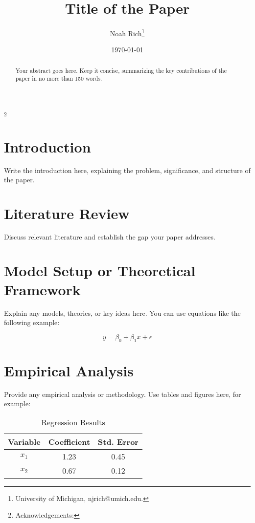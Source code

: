 \documentclass[12pt,letterpaper]{article}
\title{Title of the Paper}
\author{Noah Rich\footnote{University of Michigan, njrich@umich.edu.}}
\date{\today}
\begin{document}
\maketitle
\footnote{Acknowledgements:}

\begin{abstract}
    Your abstract goes here. Keep it concise, summarizing the key contributions of the paper in no more than 150 words.
\end{abstract}

\newpage

\section{Introduction}

Write the introduction here, explaining the problem, significance, and structure of the paper.

\section{Literature Review}
Discuss relevant literature and establish the gap your paper addresses.

\section{Model Setup or Theoretical Framework}
Explain any models, theories, or key ideas here. You can use equations like the following example:

\begin{equation}
    y = \beta_0 + \beta_1 x + \epsilon
\end{equation}

\section{Empirical Analysis}
Provide any empirical analysis or methodology. Use tables and figures here, for example:

\begin{table}[h!]
    \centering
    \begin{tabular}{|c|c|c|}
        \hline
        Variable & Coefficient & Std. Error \\
        \hline
        $x_1$ & 1.23 & 0.45 \\
        $x_2$ & 0.67 & 0.12 \\
        \hline
    \end{tabular}
    \caption{Regression Results}
\end{table}
\end{document}
